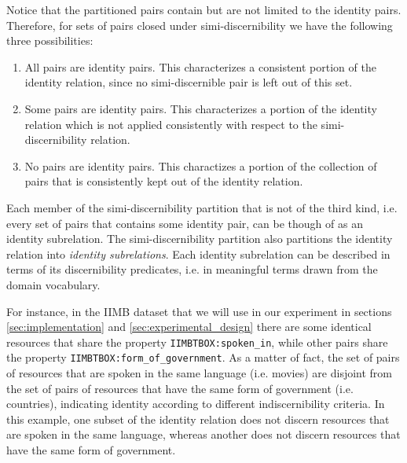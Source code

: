 Notice that the partitioned pairs contain but are not limited to
  the identity pairs.
Therefore, for sets of pairs closed under simi-discernibility
  we have the following three possibilities:
  \begin{enumerate}
    \item All pairs are identity pairs.
          This characterizes a consistent portion of the identity relation,
          since no simi-discernible pair is left out of this set.
    \item Some pairs are identity pairs.
          This characterizes a portion of the identity relation which is not
          applied consistently with respect to
          the simi-discernibility relation.
    \item No pairs are identity pairs.
          This charactizes a portion of the collection of pairs
          that is consistently kept out of the identity relation.
  \end{enumerate}

\noindent Each member of the simi-discernibility partition that is not
  of the third kind, i.e. every set of pairs that contains some identity pair,
  can be though of as an identity subrelation.
The simi-discernibility partition also partitions the identity relation
  into \emph{identity subrelations}.
Each identity subrelation can be described in terms of
  its discernibility predicates,
  i.e. in meaningful terms drawn from the domain vocabulary.

For instance, in the IIMB dataset that we will use in our experiment
  in sections \ref{sec:implementation} and \ref{sec:experimental_design}
  there are some identical resources that share
  the property {\small \texttt{IIMBTBOX:spoken\_in}},
  while other pairs share the property
  {\small \texttt{IIMBTBOX:form\_of\_government}}.
As a matter of fact, the set of pairs of resources that are spoken in
  the same language (i.e. movies) are disjoint from
  the set of pairs of resources that have the same form of government
  (i.e. countries), indicating identity according to
  different indiscernibility criteria.
In this example, one subset of the identity relation does not discern
  resources that are spoken in the same language,
  whereas another does not discern resources that have
  the same form of government.



